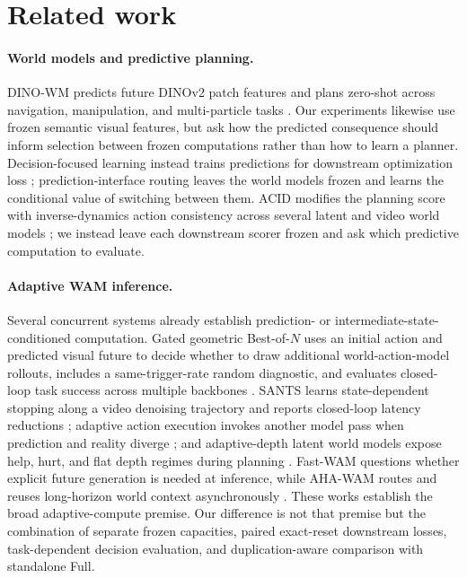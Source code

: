 \documentclass[10pt]{article}
\theoremstyle{definition}
\theoremstyle{remark}
\begin{document}
\section{Related work}

\paragraph{World models and predictive planning.}
DINO-WM predicts future DINOv2 patch features and plans zero-shot across
navigation, manipulation, and multi-particle tasks
\citep{zhou2024dinowm,ocquab2023dinov2}.  Our experiments likewise use frozen
semantic visual features, but ask how the predicted consequence should inform
selection between frozen computations rather than how to learn a planner.
Decision-focused learning instead trains predictions for downstream
optimization loss \citep{wilder2019melding}; prediction-interface routing
leaves the world models frozen and learns the conditional value of switching
between them.  ACID modifies the planning score with inverse-dynamics action
consistency across several latent and video world models
\citep{seo2026acid}; we instead leave each downstream scorer frozen and ask
which predictive computation to evaluate.

\paragraph{Adaptive WAM inference.}
Several concurrent systems already establish prediction- or
intermediate-state-conditioned computation.  Gated geometric Best-of-$N$ uses
an initial action and predicted visual future to decide whether to draw
additional world-action-model rollouts, includes a same-trigger-rate random
diagnostic, and evaluates closed-loop task success across multiple backbones
\citep{zhao2026geometric}.  SANTS learns state-dependent stopping along a video
denoising trajectory and reports closed-loop latency reductions
\citep{sun2026sants}; adaptive action execution invokes another model pass when
prediction and reality diverge \citep{wang2026imagination}; and adaptive-depth
latent world models expose help, hurt, and flat depth regimes during planning
\citep{sivasankar2026adaptive}.  Fast-WAM questions whether explicit future
generation is needed at inference, while AHA-WAM routes and reuses long-horizon
world context asynchronously \citep{yuan2026fastwam,cai2026ahawam}.  These
works establish the broad adaptive-compute premise.  Our difference is not that
premise but the combination of separate frozen capacities, paired exact-reset
downstream losses, task-dependent decision evaluation, and duplication-aware
comparison with standalone Full.
\end{document}
